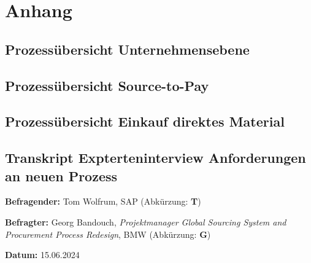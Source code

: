 \chapter{Anhang}

\section{Prozessübersicht Unternehmensebene} \label{sec:AnhangA1}

\begin{figure}
    
\end{figure}
\clearpage

\section{Prozessübersicht Source-to-Pay} \label{sec:AnhangA2}

\begin{figure}
    
\end{figure}
\clearpage

\section{Prozessübersicht Einkauf direktes Material} \label{sec:AnhangA3}

\begin{figure}
    
\end{figure}
\clearpage

\section{Transkript Expterteninterview Anforderungen an neuen Prozess} \label{sec:AnhangA4}

\textbf{Befragender:} Tom Wolfrum, SAP (Abkürzung: \textbf{T})

\textbf{Befragter:} Georg Bandouch, \textit{Projektmanager Global Sourcing System and Procurement Process Redesign}, BMW (Abkürzung: \textbf{G})

\textbf{Datum:} 15.06.2024


